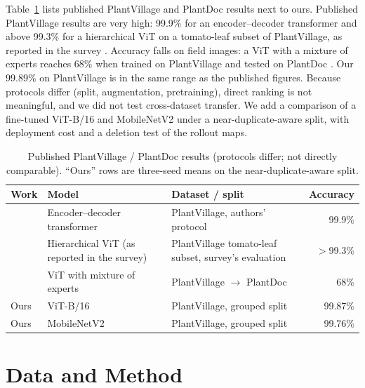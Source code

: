 \documentclass[conference]{IEEEtran}
\begin{document}
Table~\ref{tab:published} lists published PlantVillage and PlantDoc results next to ours. Published PlantVillage results are very high: 99.9\% for an encoder--decoder transformer \cite{feng2024encdec} and above 99.3\% for a hierarchical ViT on a tomato-leaf subset of PlantVillage, as reported in the survey \cite{banerjee2025eval}. Accuracy falls on field images: a ViT with a mixture of experts reaches 68\% when trained on PlantVillage and tested on PlantDoc \cite{salman2025moe}. Our 99.89\% on PlantVillage is in the same range as the published figures. Because protocols differ (split, augmentation, pretraining), direct ranking is not meaningful, and we did not test cross-dataset transfer. We add a comparison of a fine-tuned ViT-B/16 and MobileNetV2 under a near-duplicate-aware split, with deployment cost and a deletion test of the rollout maps.

\begin{table}[t]
\caption{Published PlantVillage / PlantDoc results (protocols differ; not directly comparable). ``Ours'' rows are three-seed means on the near-duplicate-aware split.}
\label{tab:published}
\centering
\footnotesize
\begin{tabular}{@{}p{1.5cm}p{2.0cm}p{2.5cm}r@{}}
\toprule
Work & Model & Dataset / split & Accuracy \\
\midrule
\mbox{\cite{feng2024encdec}} & Encoder--decoder transformer & PlantVillage, authors' protocol & 99.9\% \\
\mbox{\cite{banerjee2025eval}} & Hierarchical ViT (as reported in the survey) & PlantVillage tomato-leaf subset, survey's evaluation & $>$99.3\% \\
\mbox{\cite{salman2025moe}} & ViT with mixture of experts & PlantVillage $\rightarrow$ PlantDoc & 68\% \\
Ours & ViT-B/16 & PlantVillage, grouped split & 99.87\% \\
Ours & MobileNetV2 & PlantVillage, grouped split & 99.76\% \\
\bottomrule
\end{tabular}
\end{table}

\section{Data and Method}
\end{document}
